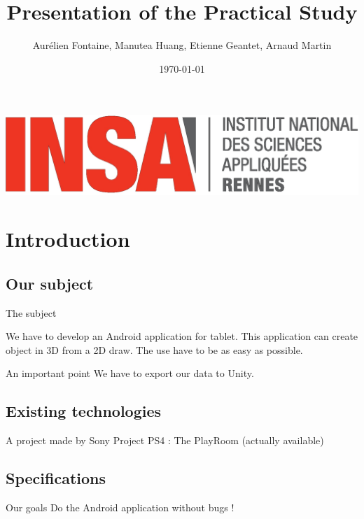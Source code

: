 \documentclass[a4paper,10pt]{beamer}
\title{Presentation of the Practical Study}
\author[Groupe 3INFO]{Aurélien Fontaine, Manutea Huang, Etienne Geantet, Arnaud Martin}
\institute[INSA de Rennes]{Institut National des Sciences Appliquées de Rennes}
\date{\today}
\begin{document}
	\begin{frame}
		\begin{titlepage}
			\centerline{\includegraphics[scale=0.1]{images/logoINSA.jpg}}
		\end{titlepage}
	\end{frame}
	
	\begin{frame}
		\tableofcontents
	\end{frame}
	
	\section{Introduction}
	
		\subsection{Our subject}
	
			\begin{frame}{The subject}
				
				We have to develop an Android application for tablet. This application can create object in 3D from a 2D draw. The use have to be as easy as possible.
				
				\begin{block}{An important point}
					We have to export our data to Unity.
				\end{block}
			\end{frame}
			
		\subsection{Existing technologies}
			
			\begin{frame}{A project made by Sony}
				Project PS4 : The PlayRoom (actually available)
			\end{frame}
		
		\subsection{Specifications}
		
			\begin{frame}{Our goals}
				Do the Android application without bugs !
			\end{frame}
	
\end{document}
